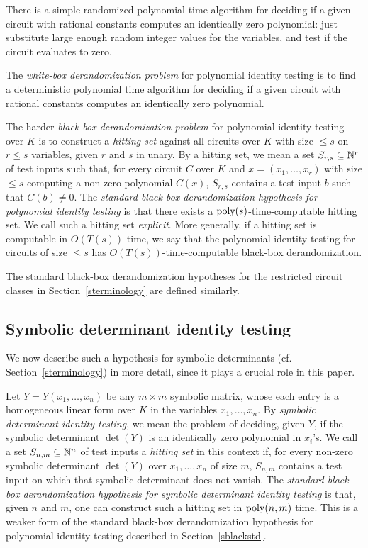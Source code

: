 \documentclass[11pt]{article}
\begin{document}
There is a simple randomized polynomial-time algorithm \cite{ibarra}  for deciding if a given 
 circuit with rational constants computes an identically zero polynomial: just 
substitute large enough random integer values for the variables, and test if the circuit
evaluates to zero.

The {\em white-box derandomization problem} \cite{russell}   for polynomial identity testing is
to find a deterministic polynomial time algorithm 
for deciding if a given  circuit with rational constants computes an identically
zero polynomial.

The harder {\em black-box derandomization problem}  for polynomial identity testing 
\cite{schnorr,impa,russell,agrawal} over $K$  is to construct  
a {\em hitting set} against all circuits over $K$ with size  $\le s$  on $r\le s$ variables, given $r$ and $s$ in unary.
By a hitting set,  we mean a set $S_{r,s} \subseteq \mathbb{N}^r$  of test inputs 
such that, for every circuit $C$ over
$K$ and $x=(x_1,\ldots,x_r)$  with size $\le s$ computing a non-zero polynomial $C(x)$,  $S_{r,s}$ contains 
a test input $b$ such that $C(b)\not =0$.  
The  {\em standard black-box-derandomization hypothesis for polynomial identity testing}  \cite{schnorr,impa,russell,agrawal}  is that there exists a  ${\mbox {poly}}(s)$-time-computable hitting set.
We call such a  hitting set {\em explicit}.
More generally, if a hitting set
is computable  in $O(T(s))$ time, 
we say that the polynomial identity testing for circuits of size $\le s$ 
has $O(T(s))$-time-computable black-box derandomization. 

The standard  black-box derandomization   hypotheses for the restricted   circuit classes 
in Section~\ref{sterminology} are defined similarly.

\subsection{Symbolic determinant identity testing} \label{ssymbdet}
We now describe such a  hypothesis for symbolic determinants
(cf. Section~\ref{sterminology}) in more detail, since it plays a crucial role in this paper.


Let $Y=Y(x_1,\ldots,x_n)$ be any $m\times m$ symbolic matrix, whose
each entry is a homogeneous linear form over $K$ in the variables $x_1,\ldots,x_n$. 
By {\em symbolic determinant identity testing}, we mean the 
problem of deciding, given $Y$,  if  the  symbolic determinant $\det(Y)$ is an identically zero polynomial
in $x_i$'s.  We call  a set $S_{n,m} \subseteq \mathbb{N}^n$  of test inputs a {\em hitting set} in this context 
if,  for every non-zero symbolic determinant $\det(Y)$ over $x_1,\ldots,x_n$ of size $m$,
$S_{n,m}$ contains a test input  on which that symbolic determinant does not vanish. 
The {\em standard black-box derandomization hypothesis   for symbolic determinant identity testing}  
\cite{schnorr,impa,russell,agrawal} 
is that, given $n$ and $m$, one can construct such a hitting set in ${\mbox {poly}}(n,m)$ time. 
This is a weaker form of the standard black-box derandomization hypothesis for polynomial identity testing 
described in Section~\ref{sblackstd}.
\end{document}
